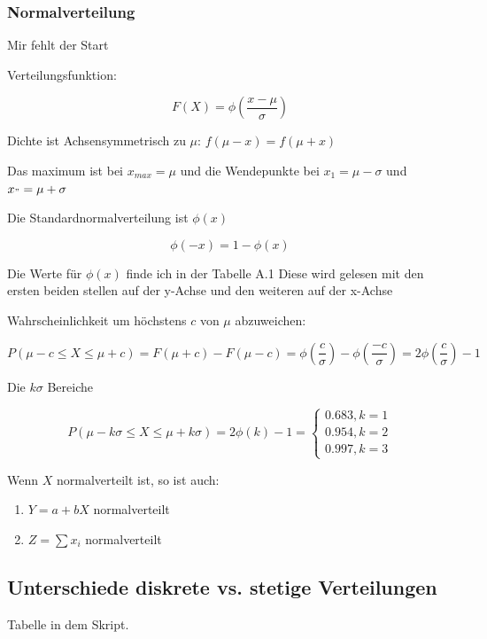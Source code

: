\documentclass[a4paper]{article}
\begin{document}
\subsubsection*{Normalverteilung}

Mir fehlt der Start

Verteilungsfunktion:

\[
F(X) = \phi(\frac{x-\mu}{\sigma})
\]

Dichte ist Achsensymmetrisch zu $\mu$: $f(\mu -x) = f(\mu + x)$

Das maximum ist bei $x_{max} = \mu$ und die Wendepunkte bei $x_1 = \mu - \sigma$ und $x_" = \mu + \sigma$

Die Standardnormalverteilung ist $\phi(x)$

\[
\phi(-x) = 1-\phi(x)
\]

Die Werte für $\phi(x)$ finde ich in der Tabelle A.1 Diese wird gelesen mit den ersten beiden stellen auf der y-Achse und den weiteren auf der x-Achse

Wahrscheinlichkeit um höchstens $c$ von $\mu$ abzuweichen:

\[
P(\mu-c \leq X \leq \mu + c) = F(\mu + c) - F(\mu - c) = \phi(\frac{c}{\sigma}) - \phi(\frac{-c}{\sigma}) = 2\phi(\frac{c}{\sigma}) - 1
\]

Die $k\sigma$ Bereiche

\[
P(\mu - k\sigma\leq X \leq \mu + k\sigma) = 2\phi(k) - 1 = \begin{cases}
    0.683, k=1\\
    0.954, k=2\\
    0.997, k=3
\end{cases}
\]

Wenn $X$ normalverteilt ist, so ist auch:

\begin{enumerate}
    \item $Y = a + bX$ normalverteilt
    \item $Z = \sum x_i$ normalverteilt
\end{enumerate}

\subsection{Unterschiede diskrete vs. stetige Verteilungen}

Tabelle in dem Skript.

\end{document}

